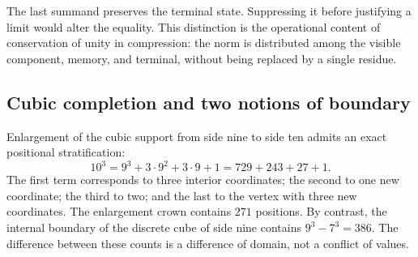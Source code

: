 The last summand preserves the terminal state. Suppressing it before justifying a limit would alter the equality. This distinction is the operational content of conservation of unity in compression: the norm is distributed among the visible component, memory, and terminal, without being replaced by a single residue.


\subsection{Cubic completion and two notions of boundary}

Enlargement of the cubic support from side nine to side ten admits an exact positional stratification:
\begin{equation}
 10^3=9^3+3\cdot9^2+3\cdot9+1=729+243+27+1.
 \label{eq:cubo}
\end{equation}
The first term corresponds to three interior coordinates; the second to one new coordinate; the third to two; and the last to the vertex with three new coordinates. The enlargement crown contains \(271\) positions. By contrast, the internal boundary of the discrete cube of side nine contains \(9^3-7^3=386\). The difference between these counts is a difference of domain, not a conflict of values.
